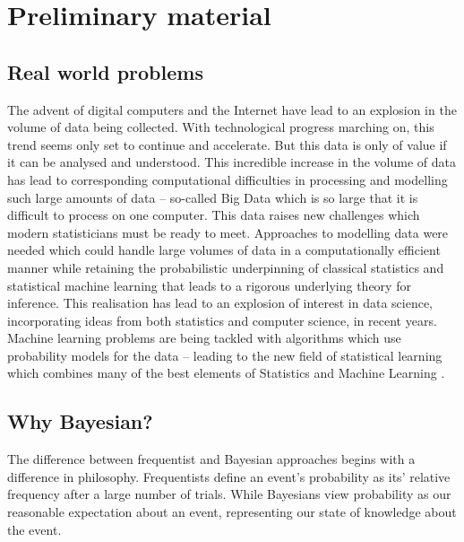 \chapter{Preliminary material}

\section{Real world problems}

The advent of digital computers and the Internet have lead to an explosion in the volume of data being
collected. With technological progress marching on, this trend seems only set to continue and accelerate. But
this data is only of value if it can be analysed and understood.  This incredible increase in the volume of
data has lead to corresponding computational difficulties in processing and modelling such large amounts of
data -- so-called Big Data which is so large that it is difficult to process on one computer. This data raises
new challenges which modern statisticians must be ready to meet. Approaches to modelling data were needed
which could handle large volumes of data in a computationally efficient manner while retaining the
probabilistic underpinning of classical statistics and statistical machine learning that leads to a rigorous
underlying theory for inference. This realisation has lead to an explosion of interest in data science,
incorporating ideas from both statistics and computer science, in recent years. Machine learning problems are
being tackled with algorithms which use probability models for the data -- leading to the new field of
statistical learning which combines many of the best elements of Statistics and Machine Learning
\citep{James:2014:ISL:2517747} \citep{MacKay:2002:ITI:971143} \citep{hastie01statisticallearning}
\citep{Murphy:2012:MLP:2380985}.

\section{Why Bayesian?}
The difference between frequentist and Bayesian approaches begins with a difference in philosophy.
Frequentists define an event's probability as its' relative frequency after a large number of trials.
While Bayesians view probability as our reasonable expectation about an event, representing our state of knowledge about the event.

